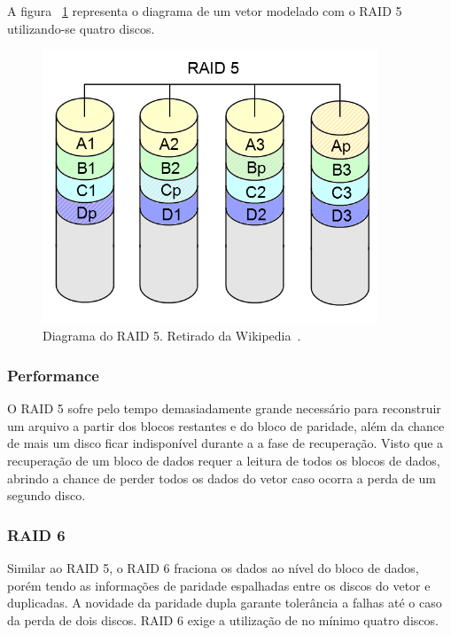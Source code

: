 		A figura ~\ref{fig:raid5} representa o diagrama de um vetor modelado com o RAID 5 utilizando-se quatro discos.\\
		
		\begin{figure}[htb]
			\begin{center}
				
				\includegraphics[clip,width=10.0cm]{images/RAID_5.png}
				\caption{Diagrama do RAID 5. Retirado da Wikipedia~\citep{wikiRAIDlevels}.}
				\label{fig:raid5}
			\end{center}
		\end{figure} 
		
		\subsubsection{Performance}
		O RAID 5 sofre pelo tempo demasiadamente grande necessário para reconstruir um arquivo a partir dos blocos restantes e do bloco de paridade, além da chance de mais um disco ficar indisponível durante a a fase de recuperação. Visto que a recuperação de um bloco de dados requer a leitura de todos os blocos de dados, abrindo a chance de perder todos os dados do vetor caso ocorra a perda de um segundo disco.\\
		
		\subsubsection{RAID 6}
		Similar ao RAID 5, o RAID 6 fraciona os dados ao nível do bloco de dados, porém tendo as informações de paridade espalhadas entre os discos do vetor e duplicadas. A novidade da paridade dupla garante tolerância a falhas até o caso da perda de dois discos. RAID 6 exige a utilização de no mínimo quatro discos. \\ 
		
